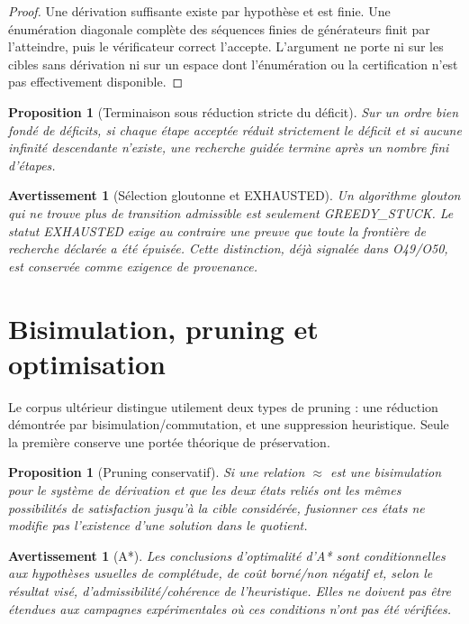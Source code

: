 \documentclass[11pt,a4paper,openany]{book}
\newtheorem{proposition}[definition]{Proposition}
\newtheorem{warning}[definition]{Avertissement}
\begin{document}
\begin{proof}
\small
Une dérivation suffisante existe par hypothèse et est finie. Une énumération diagonale complète des séquences finies de générateurs finit par l'atteindre, puis le vérificateur correct l'accepte. L'argument ne porte ni sur les cibles sans dérivation ni sur un espace dont l'énumération ou la certification n'est pas effectivement disponible.
\normalsize
\end{proof}

\begin{proposition}[Terminaison sous réduction stricte du déficit]
Sur un ordre bien fondé de déficits, si chaque étape acceptée réduit strictement le déficit et si aucune infinité descendante n'existe, une recherche guidée termine après un nombre fini d'étapes.
\end{proposition}

\begin{warning}[Sélection gloutonne et EXHAUSTED]
Un algorithme glouton qui ne trouve plus de transition admissible est seulement \emph{GREEDY\_STUCK}. Le statut \emph{EXHAUSTED} exige au contraire une preuve que toute la frontière de recherche déclarée a été épuisée. Cette distinction, déjà signalée dans O49/O50, est conservée comme exigence de provenance.
\end{warning}

\section{Bisimulation, pruning et optimisation}

Le corpus ultérieur distingue utilement deux types de pruning : une réduction démontrée par bisimulation/commutation, et une suppression heuristique. Seule la première conserve une portée théorique de préservation.

\begin{proposition}[Pruning conservatif]
Si une relation \(\approx\) est une bisimulation pour le système de dérivation et que les deux états reliés ont les mêmes possibilités de satisfaction jusqu'à la cible considérée, fusionner ces états ne modifie pas l'existence d'une solution dans le quotient.
\end{proposition}

\begin{warning}[A*]
Les conclusions d'optimalité d'A* sont conditionnelles aux hypothèses usuelles de complétude, de coût borné/non négatif et, selon le résultat visé, d'admissibilité/cohérence de l'heuristique. Elles ne doivent pas être étendues aux campagnes expérimentales où ces conditions n'ont pas été vérifiées.
\end{warning}
\end{document}
